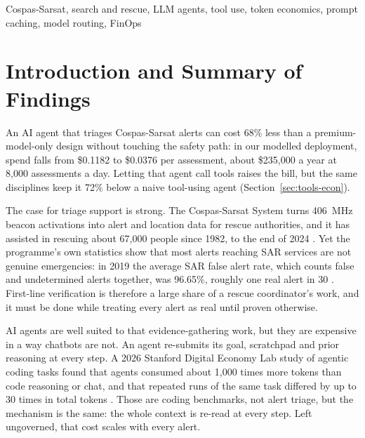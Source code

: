 \documentclass[conference]{IEEEtran}
\begin{document}
\begin{IEEEkeywords}
Cospas-Sarsat, search and rescue, LLM agents, tool use, token economics, prompt caching, model routing, FinOps
\end{IEEEkeywords}

\section{Introduction and Summary of Findings}
\label{sec:intro}

An AI agent that triages Cospas-Sarsat alerts can cost 68\% less than a premium-model-only design without touching the safety path: in our modelled deployment, spend falls from \$0.1182 to \$0.0376 per assessment, about \$235,000 a year at 8,000 assessments a day. Letting that agent call tools raises the bill, but the same disciplines keep it 72\% below a naive tool-using agent (Section~\ref{sec:tools-econ}).

The case for triage support is strong. The Cospas-Sarsat System turns 406~MHz beacon activations into alert and location data for rescue authorities, and it has assisted in rescuing about 67,000 people since 1982, to the end of 2024 \cite{paris}. Yet the programme's own statistics show that most alerts reaching SAR services are not genuine emergencies: in 2019 the average SAR false alert rate, which counts false and undetermined alerts together, was 96.65\%, roughly one real alert in 30 \cite{far}. First-line verification is therefore a large share of a rescue coordinator's work, and it must be done while treating every alert as real until proven otherwise.

AI agents are well suited to that evidence-gathering work, but they are expensive in a way chatbots are not. An agent re-submits its goal, scratchpad and prior reasoning at every step. A 2026 Stanford Digital Economy Lab study of agentic coding tasks found that agents consumed about 1,000 times more tokens than code reasoning or chat, and that repeated runs of the same task differed by up to 30 times in total tokens \cite{bai}. Those are coding benchmarks, not alert triage, but the mechanism is the same: the whole context is re-read at every step. Left ungoverned, that cost scales with every alert.
\end{document}
